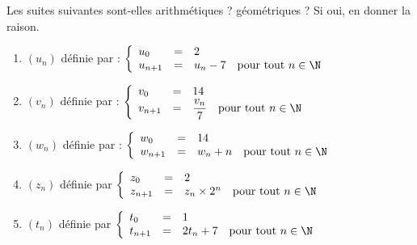 \documentclass[a4paper,11pt,exos]{nsi} %
\begin{document}
\setlength{\columnseprule}{0.5pt}
\setlength{\columnsep}{1cm}

\maketitle

Les suites suivantes sont-elles arithmétiques ? géométriques ? Si oui, en donner la raison.
		\begin{enumerate}
			\item 	$(u_n)$ définie par : $\left\{
			\begin{array}{llll}
				u_0 & = & 2 &\\ 
				u_{n+1} & = & u_n-7&\text{pour tout}\  n\in\N\\
			\end{array}\right. $
		
			\item 	$(v_n)$ définie par : $\left\{
			\begin{array}{llll}
				v_0 & = & 14 &\\ 
				v_{n+1} & = & \dfrac{v_n}{7}&\text{pour tout}\  n\in\N\\
			\end{array}\right. $
			
			\item 	$(w_n)$ définie par : $\left\{
			\begin{array}{llll}
				w_0 & = & 14 &\\ 
				w_{n+1} & = & w_n+n&\text{pour tout}\  n\in\N\\
			\end{array}\right. $
		
			\item 	$(z_n)$ définie par $\left\{
			\begin{array}{llll}
				z_0 & = & 2 &\\ 
				z_{n+1} & = & z_n\times 2^n&\text{pour tout}\  n\in\N\\
			\end{array}\right. $
		
		\item	$(t_n)$ définie par $\left\{
		\begin{array}{llll}
			t_0 & = & 1 &\\ 
			t_{n+1} & = & 2t_n+7&\text{pour tout}\  n\in\N\\
		\end{array}\right. $
			
		\end{enumerate}
\end{document}
